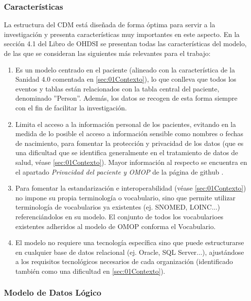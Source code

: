 \subsubsection{Características}

La estructura del CDM está diseñada de forma óptima para servir a la investigación y presenta características muy importantes en este aspecto. En la sección 4.1 del Libro de OHDSI se presentan todas las características del modelo, de las que se consideran las siguientes más relevantes para el trabajo:

\begin{enumerate}[label=\alph*.]
    \item Es un modelo centrado en el paciente (alineado con la característica de la Sanidad 4.0 comentada en \ref{sec:01Contexto}), lo que conlleva que todos los eventos y tablas están relacionados con la tabla central del paciente, denominado ''Person''. Además, los datos se recogen de esta forma siempre con el fin de facilitar la investigación.
    \item Limita el acceso a la información personal de los pacientes, evitando en la medida de lo posible el acceso a información sensible como nombres o fechas de nacimiento, para fomentar la protección y privacidad de los datos (que es una dificultad que se identifica generalmente en el tratamiento de datos de salud, véase \ref{sec:01Contexto}). Mayor información al respecto se encuentra en el apartado \textit{Privacidad del paciente y OMOP} de la página de github \cite{gitPagesCMD}.
    \item Para fomentar la estandarización e interoperabilidad (véase \ref{sec:01Contexto}) no impone su propia terminología o vocabulario, sino que permite utilizar terminología de vocabularios ya existentes (ej. SNOMED, LOINC...) referenciándolos en su modelo. El conjunto de todos los vocabularioes existentes adheridos al modelo de OMOP conforma el Vocabulario.
    \item El modelo no requiere una tecnología específica sino que puede estructurarse en cualquier base de datos relacional (ej. Oracle, SQL Server...), ajustándose a los requisitos tecnológicos necesarios de cada organización (identificado también como una dificultad en \ref{sec:01Contexto}).
    
\end{enumerate}

\subsubsection{Modelo de Datos Lógico}

